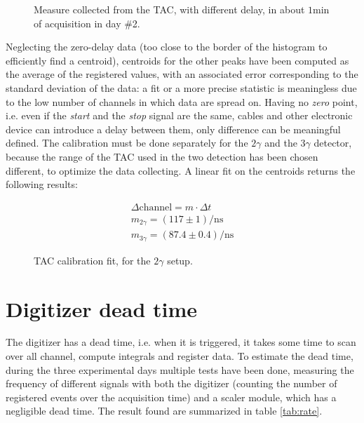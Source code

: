 \documentclass[11pt,a4 paper]{article}
\begin{document}
\begin{figure}
    \centering
    \caption{Measure collected from the TAC, with different delay, in about $1\si{\minute}$ of acquisition in day \#2.}
    \label{fig:tachisto}
\end{figure}

Neglecting the zero-delay data (too close to the border of the histogram to efficiently find a centroid), centroids for the other peaks have been computed as the average of the registered values, with an associated error corresponding to the standard deviation of the data: a fit or a more precise statistic is meaningless due to the low number of channels in which data are spread on. Having no \emph{zero} point, i.e. even if the \emph{start} and the \emph{stop} signal are the same, cables and other electronic device can introduce a delay between them, only difference can be meaningful defined. The calibration must be done separately for the $2\gamma$ and the $3\gamma$ detector, because the range of the TAC used in the two detection has been chosen different, to optimize the data collecting. A linear fit on the centroids returns the following results:

\begin{gather*}
    \Delta\text{channel}  = m \cdot \Delta t \\
    m_{2\gamma} = ( 117 \pm 1 )\si{\per\nano\second} \\
    m_{3\gamma} = ( 87.4 \pm 0.4 )\si{\per\nano\second}
\end{gather*}

\begin{figure}[H]
    \centering
    \caption{TAC calibration fit, for the $2\gamma$ setup.}
    \label{fig:tac_calibr_fit}
\end{figure}



\section{Digitizer dead time}
The digitizer has a dead time, i.e. when it is triggered, it takes some time to scan over all channel, compute integrals and register data. To estimate the dead time, during the three experimental days multiple tests have been done, measuring the frequency of different signals with both the digitizer (counting the number of registered events over the acquisition time) and a scaler module, which has a negligible dead time. The result found are summarized in table \ref{tab:rate}.
\end{document}
